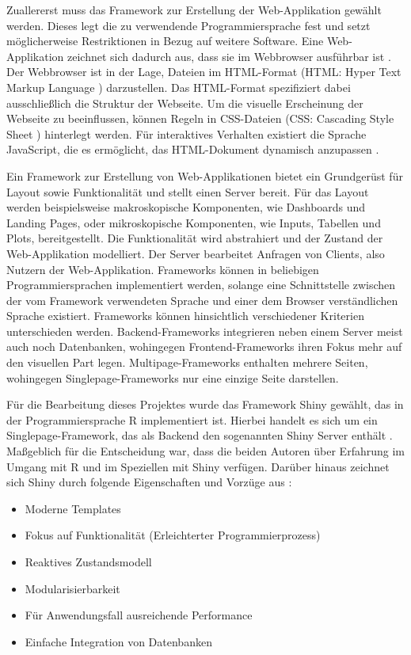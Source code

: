 \documentclass[
]{article}
\providecommand{\tightlist}{%
  \setlength{\itemsep}{0pt}\setlength{\parskip}{0pt}}
\begin{document}
Zuallererst muss das Framework zur Erstellung der Web-Applikation gewählt werden. Dieses legt die zu verwendende Programmiersprache fest und setzt möglicherweise Restriktionen in Bezug auf weitere Software. Eine Web-Applikation zeichnet sich dadurch aus, dass sie im Webbrowser ausführbar ist \autocite{webappdef}. Der Webbrowser ist in der Lage, Dateien im HTML-Format (HTML: Hyper Text Markup Language \autocite{html}) darzustellen. Das HTML-Format spezifiziert dabei ausschließlich die Struktur der Webseite. Um die visuelle Erscheinung der Webseite zu beeinflussen, können Regeln in CSS-Dateien (CSS: Cascading Style Sheet \autocite{css}) hinterlegt werden. Für interaktives Verhalten existiert die Sprache JavaScript, die es ermöglicht, das HTML-Dokument dynamisch anzupassen \autocite{javascript}.

Ein Framework zur Erstellung von Web-Applikationen bietet ein Grundgerüst für Layout sowie Funktionalität und stellt einen Server bereit. Für das Layout werden beispielsweise makroskopische Komponenten, wie Dashboards und Landing Pages, oder mikroskopische Komponenten, wie Inputs, Tabellen und Plots, bereitgestellt. Die Funktionalität wird abstrahiert und der Zustand der Web-Applikation modelliert. Der Server bearbeitet Anfragen von Clients, also Nutzern der Web-Applikation. Frameworks können in beliebigen Programmiersprachen implementiert werden, solange eine Schnittstelle zwischen der vom Framework verwendeten Sprache und einer dem Browser verständlichen Sprache existiert. Frameworks können hinsichtlich verschiedener Kriterien unterschieden werden. Backend-Frameworks integrieren neben einem Server meist auch noch Datenbanken, wohingegen Frontend-Frameworks ihren Fokus mehr auf den visuellen Part legen. Multipage-Frameworks enthalten mehrere Seiten, wohingegen Singlepage-Frameworks nur eine einzige Seite darstellen.\autocite{framework}

Für die Bearbeitung dieses Projektes wurde das Framework Shiny gewählt, das in der Programmiersprache R implementiert ist. Hierbei handelt es sich um ein Singlepage-Framework, das als Backend den sogenannten Shiny Server enthält \autocite{shiny}. Maßgeblich für die Entscheidung war, dass die beiden Autoren über Erfahrung im Umgang mit R und im Speziellen mit Shiny verfügen. Darüber hinaus zeichnet sich Shiny durch folgende Eigenschaften und Vorzüge aus \autocite{shiny}:

\begin{itemize}
\tightlist
\item
  Moderne Templates
\item
  Fokus auf Funktionalität (Erleichterter Programmierprozess)
\item
  Reaktives Zustandsmodell
\item
  Modularisierbarkeit
\item
  Für Anwendungsfall ausreichende Performance
\item
  Einfache Integration von Datenbanken
\end{itemize}
\end{document}
